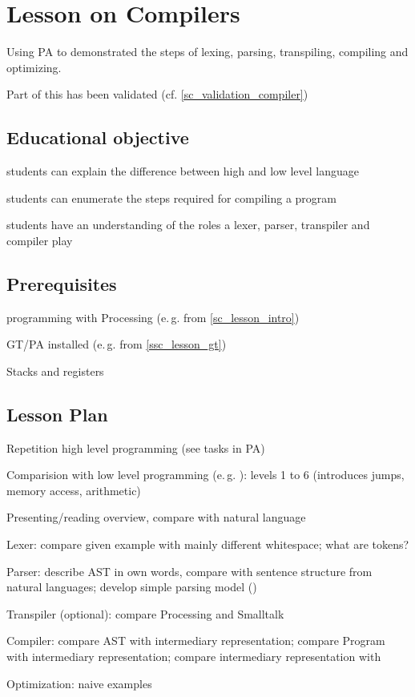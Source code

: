 \section{Lesson on Compilers} \label{sc_lesson_compiler}

Using PA to demonstrated the steps of lexing, parsing, transpiling, compiling and optimizing.

Part of this has been validated (cf. \ref{sc_validation_compiler})


\subsection{Educational objective}

\begin{todo}
\item students can explain the difference between high and low level language
\item students can enumerate the steps required for compiling a program
\item students have an understanding of the roles a lexer, parser, transpiler and compiler play
\end{todo}


\subsection{Prerequisites}

\begin{todo}
\item programming with Processing (e.\,g. from \ref{sc_lesson_intro})
\item GT/PA installed (e.\,g. from \ref{ssc_lesson_gt})
\item Stacks and registers
\end{todo}


\subsection{Lesson Plan}

\begin{todo}
\item Repetition high level programming (see tasks in PA)
\item Comparision with low level programming (e.\,g. \cite{Tom15}): levels 1 to 6 (introduces jumps, memory access, arithmetic)
\item Presenting/reading overview, compare with natural language
\item Lexer: compare given example with mainly different whitespace; what are tokens?
\item Parser: describe AST in own words, compare with sentence structure from natural languages; develop simple parsing model ()
\item Transpiler (optional): compare Processing and Smalltalk
\item Compiler: compare AST with intermediary representation; compare Program with intermediary representation; compare intermediary representation with \cite{Tom15}
\item Optimization: naive examples
\end{todo}



